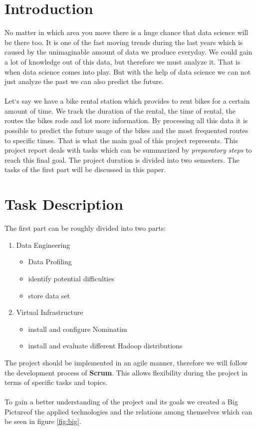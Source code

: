 \documentclass[12pt]{article}
\begin{document}
\section{Introduction}
No matter in which area you move there is a huge chance that data science will be there too. It is one of the fast moving trends during the last years which is caused by the unimaginable amount of data we produce everyday. We could gain a lot of knowledge out of this data, but therefore we must analyze it. That is when data science comes into play. But with the help of data science we can not just analyze the past we can also predict the future.\\\\
Let`s say we have a bike rental station which provides to rent bikes for a certain amount of time. We track the duration of the rental, the time of rental, the routes the bikes rode and lot more information. By processing all this data it is possible to predict the future usage of the bikes and the most frequented routes to specific times.
That is what the main goal of this project represents. This project report deals with tasks which can be summarized by \emph{preparatory steps} to reach this final goal. The project duration is divided into two semesters. The tasks of the first part will be discussed in this paper.

\section{Task Description}\label{tasks}
The first part can be roughly divided into two parts:
\begin{enumerate}
\item Data Engineering
\begin{itemize}
\item Data Profiling
\item identify potential difficulties
\item store data set
\end{itemize}
\item Virtual Infrastructure
\begin{itemize}
\item install and configure Nominatim
\item install and evaluate different Hadoop distributions
\end{itemize}
\end{enumerate}
The project should be implemented in an agile manner, therefore we will follow the development process of \textbf{Scrum}. This allows flexibility during the project in terms of specific tasks and topics.
\\\\
To gain a better understanding of the project and its goals we created a \glqq Big Picture\grqq of the applied technologies and the relations among themselves which can be seen in figure \ref{fig:big}.
\end{document}
